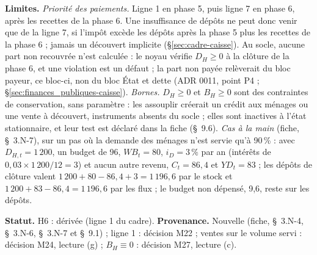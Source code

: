 \documentclass[11pt,a4paper]{article}
\newcommand{\limites}{\par\noindent\textbf{Limites.} }
\begin{document}
\begin{proposee}
\limites \emph{Priorité des paiements.} Ligne 1 en phase 5, puis ligne 7 en phase 6, après les recettes de la phase 6. Une insuffisance de dépôts ne peut donc venir que de la ligne 7, si l'impôt excède les dépôts après la phase 5 plus les recettes de la phase 6 ; jamais un découvert implicite (\S\ref{sec:cadre-caisse}). Au socle, aucune part non recouvrée n'est calculée : le noyau vérifie $D_H \ge 0$ à la clôture de la phase 6, et une violation est un défaut ; la part non payée relèverait du bloc payeur, ce bloc-ci, non du bloc État et dette (ADR 0011, point P4 ; \S\ref{sec:finances_publiques-caisse}). \emph{Bornes.} $D_H \ge 0$ et $B_H \ge 0$ sont des contraintes de conservation, sans paramètre : les assouplir créerait un crédit aux ménages ou une vente à découvert, instruments absents du socle ; elles sont inactives à l'état stationnaire, et leur test est déclaré dans la fiche (\S~9.6). \emph{Cas à la main} (fiche, \S~3.N-7), sur un pas où la demande des ménages n'est servie qu'à 90\,\% : avec $D_{H,t} = 1\,200$, un budget de 96, $\mathit{WB}_t = 80$, $i_D = 3\,\%$ par an (intérêts de $0{,}03 \times 1\,200/12 = 3$) et aucun autre revenu, $C_t = 86{,}4$ et $\mathit{YD}_t = 83$ ; les dépôts de clôture valent $1\,200 + 80 - 86{,}4 + 3 = 1\,196{,}6$ par le stock et $1\,200 + 83 - 86{,}4 = 1\,196{,}6$ par les flux ; le budget non dépensé, 9,6, reste sur les dépôts.

\textbf{Statut.} H6 : dérivée (ligne 1 du cadre). \textbf{Provenance.} Nouvelle (fiche, \S~3.N-4, \S~3.N-6, \S~3.N-7 et \S~9.1) ; ligne 1 : décision M22 ; ventes sur le volume servi : décision M24, lecture (g) ; $B_H \equiv 0$ : décision M27, lecture (c).
\end{proposee}
\end{document}
